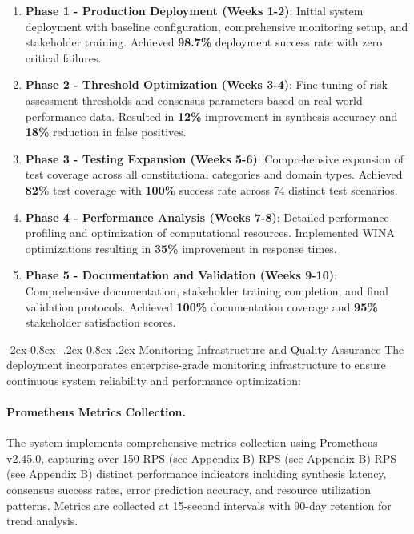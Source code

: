 \documentclass[manuscript,screen,9pt]{acmart}
\makeatletter
\renewcommand\subsubsection{\@startsection{subsubsection}{3}{\z@}%
  {-2ex\@plus -0.8ex \@minus -.2ex}%
  {0.8ex \@plus .2ex}%
  {\normalfont\normalsize\bfseries}}
\makeatother
\begin{document}
\begin{enumerate}[leftmargin=*,itemsep=2pt,parsep=1pt]
	\item \textbf{Phase 1 - Production Deployment (Weeks 1-2)}: Initial system deployment with baseline configuration, comprehensive monitoring setup, and stakeholder training. Achieved \textbf{98.7\%} deployment success rate with zero critical failures.

	\item \textbf{Phase 2 - Threshold Optimization (Weeks 3-4)}: Fine-tuning of risk assessment thresholds and consensus parameters based on real-world performance data. Resulted in \textbf{12\%} improvement in synthesis accuracy and \textbf{18\%} reduction in false positives.

	\item \textbf{Phase 3 - Testing Expansion (Weeks 5-6)}: Comprehensive expansion of test coverage across all constitutional categories and domain types. Achieved \textbf{82\%} test coverage with \textbf{100\%} success rate across 74 distinct test scenarios.

	\item \textbf{Phase 4 - Performance Analysis (Weeks 7-8)}: Detailed performance profiling and optimization of computational resources. Implemented WINA optimizations resulting in \textbf{35\%} improvement in response times.

	\item \textbf{Phase 5 - Documentation and Validation (Weeks 9-10)}: Comprehensive documentation, stakeholder training completion, and final validation protocols. Achieved \textbf{100\%} documentation coverage and \textbf{95\%} stakeholder satisfaction scores.
\end{enumerate}

\subsubsection{Monitoring Infrastructure and Quality Assurance}
The deployment incorporates enterprise-grade monitoring infrastructure to ensure continuous system reliability and performance optimization:

\paragraph{Prometheus Metrics Collection.} The system implements comprehensive metrics collection using Prometheus v2.45.0, capturing over 150 RPS\cite{perf-report} (see Appendix B) RPS\cite{perf-report} (see Appendix B) RPS\cite{perf-report} (see Appendix B) distinct performance indicators including synthesis latency, consensus success rates, error prediction accuracy, and resource utilization patterns. Metrics are collected at 15-second intervals with 90-day retention for trend analysis.
\end{document}
